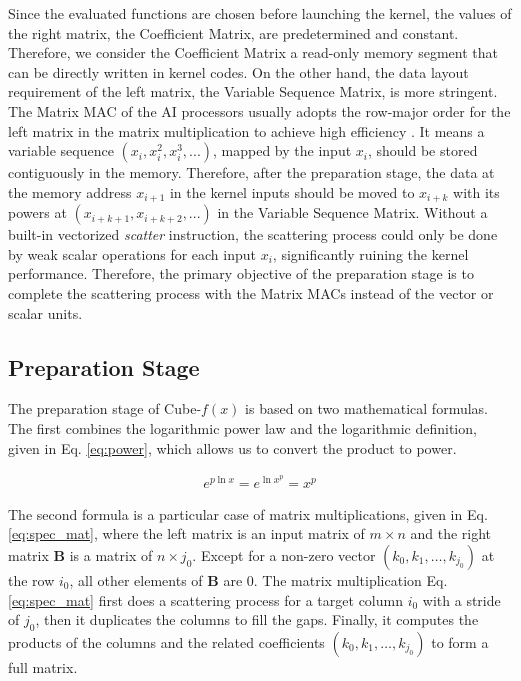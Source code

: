 \documentclass[12pt]{extbook}
\begin{document}
Since the evaluated functions are chosen before launching the kernel, the values of the right matrix, the Coefficient Matrix, are predetermined and constant. Therefore, we consider the Coefficient Matrix a read-only memory segment that can be directly written in kernel codes. On the other hand, the data layout requirement of the left matrix, the Variable Sequence Matrix, is more stringent. The Matrix MAC of the AI processors usually adopts the row-major order for the left matrix in the matrix multiplication to achieve high efficiency \cite{cambricon, CANN, jax}. It means a variable sequence $(x_{i}, x_{i}^2,  x_{i}^3, ...)$, mapped by the input $x_{i}$, should be stored contiguously in the memory. Therefore, after the preparation stage, the data at the memory address $x_{i + 1}$ in the kernel inputs should be moved to $x_{i + k}$ with its powers at $(x_{i + k + 1}, x_{i + k + 2}, ...)$ in the Variable Sequence Matrix. Without a built-in vectorized \textit{scatter} instruction, the scattering process could only be done by weak scalar operations for each input $x_{i}$, significantly ruining the kernel performance. Therefore, the primary objective of the preparation stage is to complete the scattering process with the Matrix MACs instead of the vector or scalar units.

\subsection{Preparation Stage}

The preparation stage of Cube-$f(x)$ is based on two mathematical formulas. The first combines the logarithmic power law and the logarithmic definition, given in Eq. \ref{eq:power}, which allows us to convert the product to power.

\begin{equation}
    \label{eq:power}
    \begin{aligned}
        e^{p \ln x} = e^{\ln x^p} = x^p
    \end{aligned}
    \end{equation}

The second formula is a particular case of matrix multiplications, given in Eq. \ref{eq:spec_mat}, where the left matrix is an input matrix of $m \times n$ and the right matrix $\textbf{B}$ is a matrix of $n \times j_0$. Except for a non-zero vector $(k_0, k_1, \dots, k_{j_0})$ at the row $i_0$, all other elements of $\textbf{B}$ are $0$. The matrix multiplication Eq. \ref{eq:spec_mat} first does a scattering process for a target column $i_0$ with a stride of $j_0$, then it duplicates the columns to fill the gaps. Finally, it computes the products of the columns and the related coefficients $(k_0, k_1, \dots, k_{j_0})$ to form a full matrix.
\end{document}
